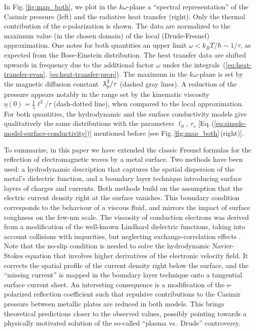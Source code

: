 \documentclass[11pt, oneside]{article}   	%
\newcommand{\lambdabar}{{\mkern+04mu\mathchar'26\mkern-09mu\lambda}}
\begin{document}
In Fig.\,\ref{fig:map_both}, we plot in the $k \omega$-plane a ``spectral representation'' of the Casimir pressure (left) and the radiative heat transfer (right). Only the thermal contribution of the s-polarization is shown. The data are normalized to the maximum value (in the chosen domain) of the local (Drude-Fresnel) approximation. One notes for both quantities an upper limit $\omega < k_BT / \hbar \sim 1/\tau$, as expected from the Bose-Einstein distribution. The heat transfer data are shifted upwards in frequency due to the additional factor $\omega$ under the integrals~(\ref{eq:heat-transfer-evan}, \ref{eq:heat-transfer-prop}). The maximum in the $k\omega$-plane is set by the magnetic diffusion constant $\lambdabar_p^2/\tau$ (dashed gray lines). A reduction of the pressure appears notably in the range set by the kinematic viscosity $\eta(0) = \frac15 \ell^2/\tau$ (dash-dotted line), when compared to the local approximation. For both quantities, the hydrodynamic and the surface conductivity models give qualitatively the same distributions with the parameters $\ell_0$, $\tau_s$ [Eq.\,(\ref{eq:simple-model-surface-conductivity})] mentioned before [see Fig.\,\ref{fig:map_both}\,(right)].


To summarize, in this paper we have extended the classic Fresnel formulas for the reflection of electromagnetic waves by a metal surface. Two methods have been used: a hydrodynamic description that captures the spatial dispersion of the metal's dielectric function, and a boundary layer technique introducing surface layers of charges and currents. Both methods build on the assumption that the electric current density right at the surface vanishes. This boundary condition corresponds to the behaviour of a viscous fluid, and mirrors the impact of surface roughness on the few-nm scale. The viscosity of conduction electrons was derived from a modification of the well-known Lindhard dielectric functions, taking into account collisions with impurities, but neglecting exchange-correlation effects \citep{Conti_1999}. Note that the no-slip condition is needed to solve the hydrodynamic Navier-Stokes equation that involves higher derivatives of the electronic velocity field. It corrects the spatial profile of the current density right below the surface, and the ``missing current'' is mapped in the boundary layer technique onto a tangential surface current sheet. 
An interesting consequence is a modification of the s-polarized reflection coefficient such that 
repulsive contributions to the Casimir pressure between metallic plates are reduced in both models. This brings theoretical predictions closer to the observed values, possibly pointing towards a physically motivated solution of the so-called ``plasma vs.\ Drude'' controversy.
\end{document}
